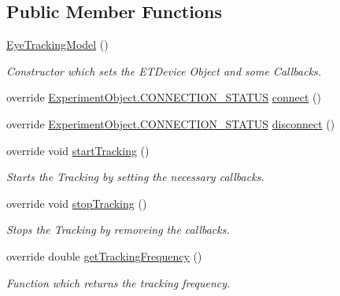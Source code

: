 \subsection*{Public Member Functions}
\begin{DoxyCompactItemize}
\item 
\hyperlink{class_web_analyzer_1_1_eye_tracking_1_1_eye_tracking_model_a6be62a4dc74db08b88c80aa8603a06e2}{Eye\+Tracking\+Model} ()
\begin{DoxyCompactList}\small\item\em Constructor which sets the E\+T\+Device Object and some Callbacks. \end{DoxyCompactList}\item 
override \hyperlink{class_web_analyzer_1_1_u_i_1_1_interaction_objects_1_1_experiment_object_a2875208b4f4b0ed643593152f4ec025c}{Experiment\+Object.\+C\+O\+N\+N\+E\+C\+T\+I\+O\+N\+\_\+\+S\+T\+A\+T\+U\+S} \hyperlink{class_web_analyzer_1_1_eye_tracking_1_1_eye_tracking_model_a24496245bd949730f0f56d328ff74690}{connect} ()
\item 
override \hyperlink{class_web_analyzer_1_1_u_i_1_1_interaction_objects_1_1_experiment_object_a2875208b4f4b0ed643593152f4ec025c}{Experiment\+Object.\+C\+O\+N\+N\+E\+C\+T\+I\+O\+N\+\_\+\+S\+T\+A\+T\+U\+S} \hyperlink{class_web_analyzer_1_1_eye_tracking_1_1_eye_tracking_model_a8282209f61b0a45f09551ffe72cab136}{disconnect} ()
\item 
override void \hyperlink{class_web_analyzer_1_1_eye_tracking_1_1_eye_tracking_model_a73bde5a5915a3a33a368e5bdf1b203ca}{start\+Tracking} ()
\begin{DoxyCompactList}\small\item\em Starts the Tracking by setting the necessary callbacks. \end{DoxyCompactList}\item 
override void \hyperlink{class_web_analyzer_1_1_eye_tracking_1_1_eye_tracking_model_ae65a98fe8a1ccd24838f7af022edd174}{stop\+Tracking} ()
\begin{DoxyCompactList}\small\item\em Stops the Tracking by removeing the callbacks. \end{DoxyCompactList}\item 
override double \hyperlink{class_web_analyzer_1_1_eye_tracking_1_1_eye_tracking_model_a974f53dd33c205cf772d98eeb7adddd0}{get\+Tracking\+Frequency} ()
\begin{DoxyCompactList}\small\item\em Function which returns the tracking frequency. \end{DoxyCompactList}\end{DoxyCompactItemize}
